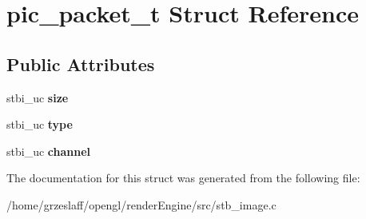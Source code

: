 \hypertarget{structpic__packet__t}{\section{pic\-\_\-packet\-\_\-t Struct Reference}
\label{structpic__packet__t}
}
\subsection*{Public Attributes}
\begin{DoxyCompactItemize}
\item 
\hypertarget{structpic__packet__t_ad33021e40c272a20d89bdcceabb20a71}{stbi\-\_\-uc {\bfseries size}}\label{structpic__packet__t_ad33021e40c272a20d89bdcceabb20a71}

\item 
\hypertarget{structpic__packet__t_abc346cfdcff43f051830335296f14aaa}{stbi\-\_\-uc {\bfseries type}}\label{structpic__packet__t_abc346cfdcff43f051830335296f14aaa}

\item 
\hypertarget{structpic__packet__t_af64f17c991495f3f3baf6782a253f7cc}{stbi\-\_\-uc {\bfseries channel}}\label{structpic__packet__t_af64f17c991495f3f3baf6782a253f7cc}

\end{DoxyCompactItemize}


The documentation for this struct was generated from the following file\-:\begin{DoxyCompactItemize}
\item 
/home/grzeslaff/opengl/render\-Engine/src/stb\-\_\-image.\-c\end{DoxyCompactItemize}
